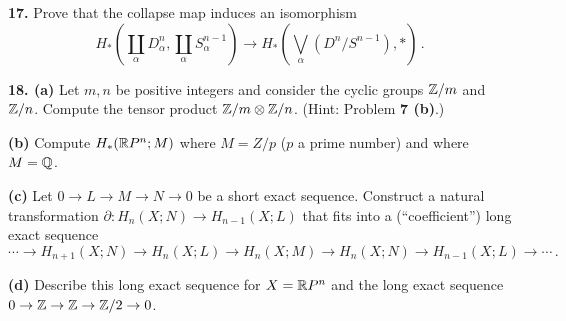 \documentclass[12pt]{article}
\begin{document}
\medskip
{\bf 17.} Prove that the collapse map induces an isomorphism
\[
H_*\left(\coprod_\alpha D^n_\alpha,\coprod_\alpha S^{n-1}_\alpha\right)
\to
H_*\left(\bigvee_\alpha(D^n/S^{n-1}),*\right)\,.
\]

\medskip
{\bf 18. (a)} Let $m,n$ be positive integers and consider the cyclic groups
$\mathbb Z/m$ and $\mathbb Z/n$. Compute the tensor product $\mathbb Z/m\otimes\mathbb Z/n$. 
(Hint: Problem {\bf 7 (b)}.) 

{\bf(b)} Compute $H_*(\mathbb R P^n;M)$ where $M=Z/p$ ($p$ a prime number) 
and where $M=\mathbb Q$. 

{\bf(c)} Let $0\to L\to M\to N\to0$ be a short exact sequence. Construct a
natural transformation $\partial:H_n(X;N)\to H_{n-1}(X;L)$ that fits into a
(``coefficient'') long exact sequence 
\[
\cdots\to H_{n+1}(X;N)\to H_n(X;L)\to H_n(X;M)\to H_n(X;N)\to H_{n-1}(X;L)
\to\cdots\,.
\]

{\bf(d)} Describe this long exact sequence for $X=\mathbb R P^n$ and the long exact
sequence $0\to\mathbb Z\to\mathbb Z\to\mathbb Z/2\to0$.
\end{document}
